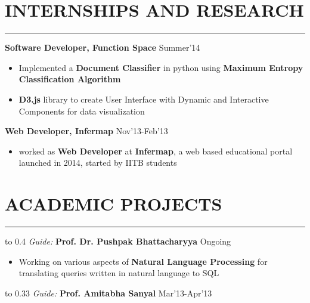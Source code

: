 \documentclass[11pt]{book} %
\begin{document}

\section*{INTERNSHIPS AND RESEARCH}
\vspace{-2mm}
\hrule
\medskip

\noindent \textbf{Software Developer, Function Space} \hfill Summer'14
\vspace{-3mm}
\begin{itemize}
\itemsep-0.3em
\item Implemented a \textbf{Document Classifier} in python using \textbf{Maximum Entropy Classification Algorithm}
\item \textbf{D3.js} library to create User Interface with Dynamic and Interactive Components for data visualization
\end{itemize}
\vspace{-1mm}

\noindent \textbf{Web Developer, Infermap} \hfill Nov'13-Feb'13
\vspace{-3mm}
\begin{itemize}
\itemsep-0.3em
\item worked as \textbf{Web Developer} at \textbf{Infermap}, a web based educational portal launched in 2014, started by IITB students
\end{itemize}
\vspace{-8mm}

\section*{ACADEMIC PROJECTS}
\vspace{-2mm}
\hrule
\medskip

\noindent\hbox to 0.4 \hfill \textit{Guide:} \textbf{Prof. Dr. Pushpak Bhattacharyya} \hfill Ongoing
\vspace{-3mm}
\begin{itemize}
\itemsep-0.3em
\item Working on various aspects of \textbf{Natural Language Processing} for translating queries written in natural language to SQL
\end{itemize}
\vspace{-1mm}

\noindent\hbox to 0.33 \hfill \textit{Guide:} \textbf{Prof. Amitabha Sanyal} \hfill Mar'13-Apr'13
\end{document}
